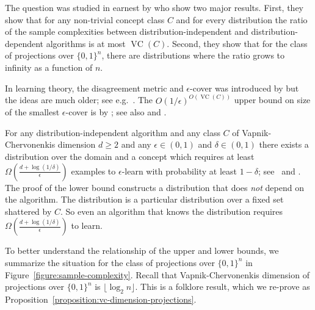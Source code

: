 \documentclass[10pt]{article}
\DeclareMathOperator{\VC}{VC}
\begin{document}
The question was studied in earnest by \cite{Darnstadt-Simon-Szorenyi-2013} who
show two major results. First, they show that for any non-trivial concept class
$C$ and for every distribution the ratio of the sample complexities between
distribution-independent and distribution-dependent algorithms is at most
$\VC(C)$. Second, they show that for the class of projections over $\{0,1\}^n$,
there are distributions where the ratio grows to infinity as a function of $n$.

In learning theory, the disagreement metric and $\epsilon$-cover was  introduced
by \cite{Benedek-Itai-1991} but the ideas are much older; see
e.g.~\cite{Dudley-1978, Dudley-1984}. The $O(1/\epsilon)^{O(\VC(C))}$ upper
bound on size of the smallest $\epsilon$-cover is by \citet[Lemma
7.13]{Dudley-1978}; see also \citet[Chapter 4]{Devroye-Lugosi-2000} and
\cite{Haussler-1995}.

For any distribution-independent algorithm and any class $C$ of
Vapnik-Chervonenkis dimension $d \ge 2$ and any $\epsilon \in (0,1)$ and $\delta
\in (0,1)$ there exists a distribution over the domain and a concept which
requires at least $\Omega \left(\frac{d + \log(1/\delta)}{\epsilon}\right)$
examples to $\epsilon$-learn with probability at least $1 - \delta$;
see~\cite[Theorem 5.3]{Anthony-Bartlett-1999} and
\cite{Blumer-Ehrenfeucht-Haussler-Warmuth-1989,
Ehrenfeucht-Haussler-Kearns-Valiant-1989}. The proof of the lower bound
constructs a distribution that does \emph{not} depend on the algorithm. The
distribution is a particular distribution over a fixed set shattered by $C$. So
even an algorithm that knows the distribution requires $\Omega \left(\frac{d +
\log(1/\delta)}{\epsilon}\right)$ to learn.

To better understand the relationship of the upper and lower bounds, we
summarize the situation for the class of projections over $\{0,1\}^n$ in
Figure~\ref{figure:sample-complexity}. Recall that Vapnik-Chervonenkis dimension
of projections over $\{0,1\}^n$ is $\lfloor \log_2 n \rfloor$. This is a
folklore result, which we re-prove as
Proposition~\ref{proposition:vc-dimension-projections}.
\end{document}
